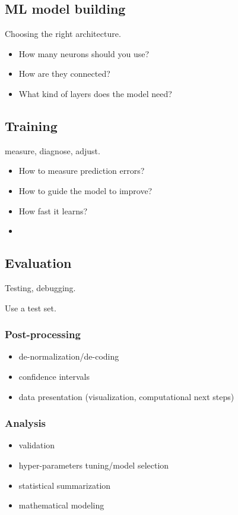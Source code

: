 \documentclass[12pt]{report}
\begin{document}
\subsection{ML model building}
Choosing the right architecture.
\begin{itemize}
  \item How many neurons should you use?
  \item How are they connected?
  \item What kind of layers does the model need?
\end{itemize}


\subsection{Training}
measure, diagnose, adjust.
\begin{itemize}
  \item How to measure prediction errors?
  \item How to guide the model to improve?
  \item How fast it learns?
  \item
\end{itemize}


\subsection{Evaluation}
Testing, debugging.

Use a test set.

\subsubsection{Post-processing}
\begin{itemize}
  \item de-normalization/de-coding
  \item confidence intervals
  \item data presentation (visualization, computational next steps)
\end{itemize}

\subsubsection{Analysis}
\begin{itemize}
  \item validation
  \item hyper-parameters tuning/model selection
  \item statistical summarization
  \item mathematical modeling
\end{itemize}
\end{document}
